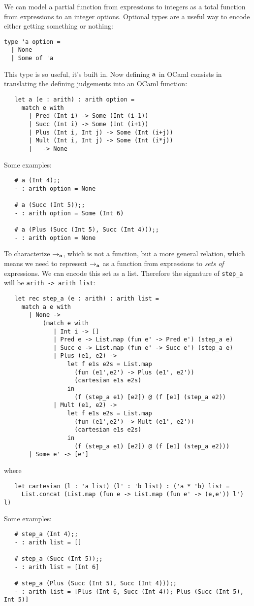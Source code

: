 We can model a partial function from expressions to integers as a
total function from expressions to an integer options.  Optional types
are a useful way to encode either getting something or nothing:
\begin{verbatim}
type 'a option =
  | None
  | Some of 'a
\end{verbatim}
This type is so useful, it's built in.  Now defining $\mathbf{a}$ in
OCaml consists in translating the defining judgements into an OCaml
function:
\begin{verbatim}
   let a (e : arith) : arith option =
     match e with
       | Pred (Int i) -> Some (Int (i-1))
       | Succ (Int i) -> Some (Int (i+1))
       | Plus (Int i, Int j) -> Some (Int (i+j))
       | Mult (Int i, Int j) -> Some (Int (i*j))
       | _ -> None
\end{verbatim}
Some examples:
\begin{verbatim}
   # a (Int 4);;
   - : arith option = None

   # a (Succ (Int 5));;
   - : arith option = Some (Int 6)

   # a (Plus (Succ (Int 5), Succ (Int 4)));;
   - : arith option = None
\end{verbatim}

To characterize $\rightarrow_\mathbf{a}$, which is not a function, but a more general
relation, which means we need to represent $\rightarrow_\mathbf{a}$ as a function from
expressions to \emph{sets of} expressions.  We can encode this set as
a list.  Therefore the signature of {\tt step\_a} will be {\tt arith ->
  arith list}:
\begin{verbatim}
   let rec step_a (e : arith) : arith list =
     match a e with
       | None -> 
           (match e with
              | Int i -> []
              | Pred e -> List.map (fun e' -> Pred e') (step_a e)
              | Succ e -> List.map (fun e' -> Succ e') (step_a e)
              | Plus (e1, e2) -> 
                  let f e1s e2s = List.map
                    (fun (e1',e2') -> Plus (e1', e2'))
                    (cartesian e1s e2s)
                  in
                    (f (step_a e1) [e2]) @ (f [e1] (step_a e2))
              | Mult (e1, e2) ->
                  let f e1s e2s = List.map
                    (fun (e1',e2') -> Mult (e1', e2'))
                    (cartesian e1s e2s)
                  in
                    (f (step_a e1) [e2]) @ (f [e1] (step_a e2)))
       | Some e' -> [e']
\end{verbatim}
where
\begin{verbatim}
   let cartesian (l : 'a list) (l' : 'b list) : ('a * 'b) list =
     List.concat (List.map (fun e -> List.map (fun e' -> (e,e')) l') l) 
\end{verbatim}
Some examples:
\begin{verbatim}
   # step_a (Int 4);;
   - : arith list = []

   # step_a (Succ (Int 5));;
   - : arith list = [Int 6]

   # step_a (Plus (Succ (Int 5), Succ (Int 4)));;
   - : arith list = [Plus (Int 6, Succ (Int 4)); Plus (Succ (Int 5), Int 5)]
\end{verbatim}



